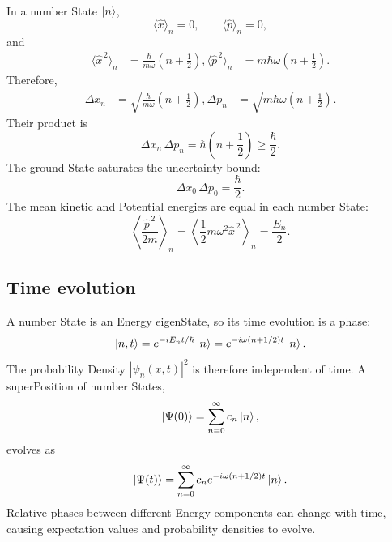 \documentclass[a4paper, 10pt, onepage]{elegantbook}
\begin{document}
{In a number State $\ket{n}$,
\begin{equation}
  \langle \hat{x}\rangle_n=0,\qquad
  \langle \hat{p}\rangle_n=0,
\end{equation}
and
\begin{align}
  \langle \hat{x}^{\,2}\rangle_n
  &=\frac{\hbar}{m\omega}\left(n+\frac{1}{2}\right),
  \langle \hat{p}^{\,2}\rangle_n
  &=m\hbar\omega\left(n+\frac{1}{2}\right).
\end{align}
Therefore,
\begin{align}
  \Delta x_n
  &=\sqrt{\frac{\hbar}{m\omega}\left(n+\frac{1}{2}\right)},
  \Delta p_n
  &=\sqrt{m\hbar\omega\left(n+\frac{1}{2}\right)}.
\end{align}
Their product is
\begin{equation}
  \Delta x_n\,\Delta p_n
  =\hbar\left(n+\frac{1}{2}\right)
  \geq \frac{\hbar}{2}.
\end{equation}
The ground State saturates the uncertainty bound:
\begin{equation}
  \Delta x_0\,\Delta p_0=\frac{\hbar}{2}.
\end{equation}
The mean kinetic and Potential energies are equal in each number
State:
\begin{equation}
  \left\langle\frac{\hat{p}^{\,2}}{2m}\right\rangle_n
  =
  \left\langle\frac{1}{2}m\omega^2\hat{x}^{\,2}\right\rangle_n
  =\frac{E_n}{2}.
\end{equation}

\subsection{Time evolution}

A number State is an Energy eigenState, so its time evolution is a
phase:
\begin{equation}
  \ket{n,t}
  =e^{-iE_nt/\hbar}\ket{n}
  =e^{-i\omega(n+1/2)t}\ket{n}.
\end{equation}
The probability Density $|\psi_n(x,t)|^2$ is therefore independent of
time. A superPosition of number States,
\begin{equation}
  \ket{\Psi(0)}=\sum_{n=0}^{\infty}c_n\ket{n},
\end{equation}
evolves as
\begin{equation}
  \ket{\Psi(t)}
  =\sum_{n=0}^{\infty}c_n
   e^{-i\omega(n+1/2)t}\ket{n}.
\end{equation}
Relative phases between different Energy components can change with
time, causing expectation values and probability densities to evolve.

}
\end{document}
